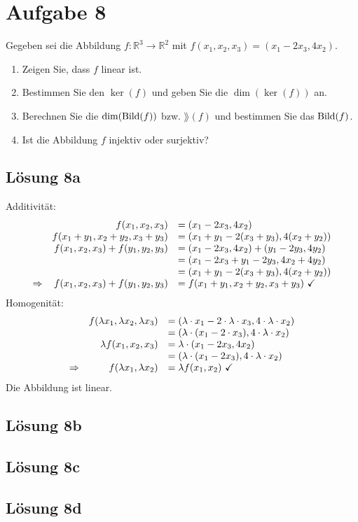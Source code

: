 \documentclass[main.tex]{subfiles}
\begin{document}
\section{Aufgabe 8}
Gegeben sei die Abbildung $f : \mathbb{R}^3 \to \mathbb{R}^2$ mit $f(x_1, x_2, x_3) = (x_1 - 2x_3, 4x_2)$.

\begin{enumerate}
    \item Zeigen Sie, dass $f$ linear ist.
    \item Bestimmen Sie den $\ker(f)$ und geben Sie die $\dim (\ker (f))$ an.
    \item Berechnen Sie die $\dim(\operatorname{Bild}(f))$ bzw. $\rang(f)$ und bestimmen Sie das $\operatorname{Bild}(f)$.
    \item Ist die Abbildung $f$ injektiv oder surjektiv?
\end{enumerate}

\subsection{Lösung 8a}
Additivität:
\begin{equation*}
    \begin{array}{ r r l }
    & f(x_1, x_2, x_3) & = (x_1 - 2x_3, 4x_2)\\
    & f(x_1 + y_1, x_2 + y_2, x_3 + y_3)  & = (x_1 + y_1 - 2(x_3 + y_3), 4(x_2 + y_2)) \\
    & f(x_1, x_2, x_3) + f(y_1, y_2, y_3) & = (x_1 - 2x_3, 4x_2) + (y_1 - 2y_3, 4y_2) \\
    & & = (x_1 - 2x_3 + y_1 - 2y_3, 4x_2 + 4y_2) \\
    & & = (x_1 + y_1 - 2(x_3 + y_3 ), 4(x_2 + y_2)) \\
    \Rightarrow  & f(x_1, x_2, x_3) + f(y_1, y_2, y_3) & = f(x_1 + y_1, x_2 + y_2, x_3 + y_3) \ \checkmark
    \end{array}
\end{equation*}
Homogenität:
\begin{equation*}
    \begin{array}{ r r l }
    & f(\lambda x_1, \lambda x_2, \lambda x_3) & = (\lambda \cdot x_1 - 2\cdot \lambda \cdot x_3, 4 \cdot \lambda \cdot x_2)\\
    & & = (\lambda \cdot (x_1 - 2 \cdot x_3), 4 \cdot \lambda \cdot x_2)\\
    & \lambda f(x_1, x_2, x_3) & = \lambda \cdot (x_1 - 2x_3, 4x_2)\\
    & & = (\lambda \cdot (x_1 - 2x_3), 4 \cdot \lambda \cdot x_2)\\
    \Rightarrow  & f( \lambda x_{1} ,\lambda x_{2}) & =\lambda f( x_{1} ,x_{2}) \ \checkmark
    \end{array}
\end{equation*}
Die Abbildung ist linear.

\subsection{Lösung 8b}
\subsection{Lösung 8c}
\subsection{Lösung 8d}
\end{document}
